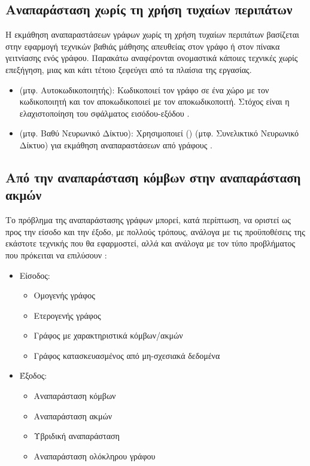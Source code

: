\subsection{Aναπαράσταση χωρίς τη χρήση τυχαίων περιπάτων}

Η εκμάθηση αναπαραστάσεων γράφων χωρίς τη χρήση τυχαίων περιπάτων βασίζεται στην εφαρμογή
τεχνικών βαθιάς μάθησης απευθείας στον γράφο ή στον πίνακα γειτνίασης ενός γράφου. Παρακάτω
αναφέρονται ονομαστικά κάποιες τεχνικές χωρίς επεξήγηση, μιας και κάτι τέτοιο ξεφεύγει από
τα πλαίσια της εργασίας.

\begin{itemize}
    \item \textbf{} (μτφ. Αυτοκωδικοποιητής): Κωδικοποιεί τον γράφο 
    σε ένα χώρο με τον κωδικοποιητή και τον αποκωδικοποιεί με τον αποκωδικοποιτή. Στόχος
    είναι η ελαχιστοποίηση του σφάλματος εισόδου-εξόδου \cite{pan2018adversarially}.
    \item \textbf{} (μτφ. Βαθύ Νευρωνικό Δίκτυο):  Χρησιμοποιεί  () (μτφ. Συνελικτικό Νευρωνικό Δίκτυο) για εκμάθηση
    αναπαραστάσεων από γράφους \cite{pmlr-v48-niepert16}.
\end{itemize}

\subsection{Από την αναπαράσταση κόμβων στην αναπαράσταση ακμών}

Το πρόβλημα της αναπαράστασης γράφων μπορεί, κατά περίπτωση, να οριστεί ως προς την είσοδο
και την έξοδο, με πολλούς τρόπους, ανάλογα με τις προϋποθέσεις της εκάστοτε τεχνικής που 
θα εφαρμοστεί, αλλά και ανάλογα με τον τύπο προβλήματος που πρόκειται να επιλύσουν
\cite{cai2017comprehensive}:

\begin{itemize}
    \item Είσοδος: \begin{itemize}
                        \item Ομογενής γράφος
                        \item Ετερογενής γράφος
                        \item Γράφος με χαρακτηριστικά κόμβων/ακμών
                        \item Γράφος κατασκευασμένος από μη-σχεσιακά δεδομένα
                   \end{itemize}
    \item Έξοδος: \begin{itemize}
                        \item Αναπαράσταση κόμβων
                        \item Αναπαράσταση ακμών
                        \item Υβριδική αναπαράσταση
                        \item Αναπαράσταση ολόκληρου γράφου
                  \end{itemize}
\end{itemize}

